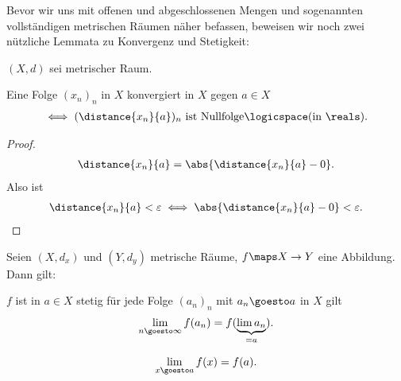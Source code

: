  Bevor wir uns mit offenen und abgeschlossenen Mengen und
sogenannten vollständigen metrischen Räumen näher befassen, beweisen wir noch zwei
nützliche Lemmata zu Konvergenz und Stetigkeit:

\begin{lemma}\label{konvergenz_abstand_ist_nullfolge}
    \( (X,d) \) sei metrischer Raum.

    Eine Folge \( (x_n)_n \) in \( X \) konvergiert in \( X \) gegen \( a\in X \)
    \begin{align*}
        \iff (\distance{x_n}{a})_n \text{ ist Nullfolge}\logicspace(\text{in } \reals).
    \end{align*}
\end{lemma}
\begin{proof}
    \begin{align*}
        \distance{x_n}{a}=\abs{\distance{x_n}{a}-0}.
    \end{align*}
    Also ist
    \begin{align*}
        \distance{x_n}{a}<\varepsilon\iff \abs{\distance{x_n}{a}-0}<\varepsilon.
    \end{align*}
    
\end{proof}
\begin{lemma}\label{stetigkeit:folgenkonvergenzkriterium}
    Seien \( (X,d_x) \) und \( (Y, d_y) \) metrische Räume, \( f\maps X\to Y \) eine Abbildung. 
    Dann gilt:

    \( f \) ist in \( a\in X \) stetig \tiff für jede Folge \( (a_n)_n \) mit \( a_n\goesto a \) in \( X \) gilt
    \begin{align*}
        \lim\limits_{n \goesto \infty}  f(a_n)=f(\underbrace{\lim a_n}_{=a}).
    \end{align*} 
    \begin{notation*}
        \begin{align*}
            \lim\limits_{x \goesto a} f(x)=f(a).
        \end{align*}
    \end{notation*}
    
\end{lemma}
